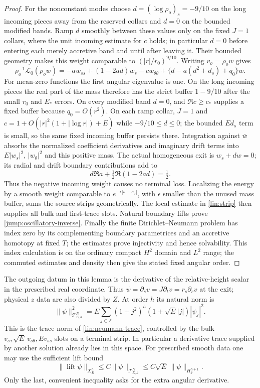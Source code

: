 \begin{proof}
For the nonconstant modes choose $d=(\log\rho_o)_s=-9/10$ on
the long incoming pieces away from the reserved collars and $d=0$ on
the bounded modified bands.  Ramp $d$ smoothly between these values
only on the fixed $J=1$ collars, where the unit incoming estimate for
$c$ holds; in particular $d=0$ before entering each merely accretive
band and until after leaving it.  Their bounded
geometry makes this weight comparable to $(|r|/r_0)^{9/10}$.
Writing $v_o=\rho_o w$ gives
\[
 \rho_o^{-1}\mathcal L_0(\rho_o w)
 =-aw_{ss}+(1-2ad)w_s-cw_{\theta\theta}
             +\{d-a(d^2+d_s)+q_0\}w.
\]
For mean-zero functions the first angular eigenvalue is one.
On the long incoming pieces the real part of the mass therefore has
the strict buffer $1-9/10$ after the small $r_0$ and $E_*$ errors.
On every modified band $d=0$, and $\Re c\geq c_*$ supplies a fixed buffer
because $q_0=O(r^2)$.  On each ramp collar, $J=1$ and
$c=1+O(|r|^2(1+|\log r|)+E)$ while $-9/10\le d\le0$;
the bounded $E d_s$ term is small, so the same fixed incoming buffer
persists there.  Integration against $\bar w$ absorbs the
normalized coefficient derivatives and imaginary drift terms into
$E|w_s|^2$, $|w_\theta|^2$ and this positive mass.  The actual
homogeneous exit is $w_s+dw=0$; its radial and drift boundary
contributions add to
\[
 d\Re a+\tfrac12\Re(1-2ad)=\tfrac12.
\]
Thus the negative incoming weight causes no terminal loss.
Localizing the energy by a smooth weight comparable to
$e^{-\epsilon|s-s_\nu|}$, with $\epsilon$ smaller than the unused
mass buffer, sums the source strips geometrically.  The local
estimate in \cref{lin:strip} then supplies all bulk and first-trace
slots.  Natural boundary lifts prove
\eqref{jump:oscillatory-inverse}.  Finally the finite
Dirichlet--Neumann problem has index zero by its complementing
boundary parametrices and an accretive homotopy at fixed $T$;
the estimates prove injectivity and hence solvability.  This index
calculation is on the ordinary compact $H^2$ domain and $L^2$
range; the commuted estimates and density then give the stated
fixed angular order.
\end{proof}

The outgoing datum in this lemma is the derivative of the
relative-height scalar in the prescribed real coordinate.  Thus
$\psi=\partial_s v=J\partial_t v=r_s\partial_r v$ at the exit;
physical $z$ data are also divided by
$Z$.  At order $h$ its natural norm is
\begin{equation}\label{jump:neumann-trace}
 \|\psi\|_{\mathcal T^N_{E,h}}^2
 =E\sum_{j\in\mathbb Z}(1+j^2)^h
                     (1+\sqrt E|j|)|\psi_j|^2.
\end{equation}
This is the trace norm of \eqref{lin:neumann-trace}, controlled by
the bulk $v_s,\sqrt E\,v_{s\theta},Ev_{ss}$ slots on a terminal
strip.  In particular a derivative trace supplied by another
solution already lies in this space.  For prescribed smooth data
one may use the sufficient lift bound
\begin{equation}\label{jump:boundary-lift}
 \|\operatorname{lift}\psi\|_{X_E^h}
 \leq C\|\psi\|_{\mathcal T^N_{E,h}}
 \leq C\sqrt E\,\|\psi\|_{H^{h+1}_\theta}.
\end{equation}
Only the last, convenient inequality asks for the extra angular
derivative.


